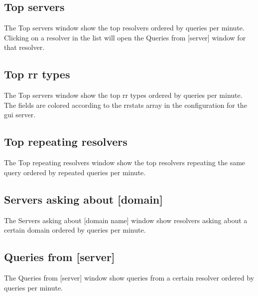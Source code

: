\documentclass[a4paper]{article}
\begin{document}
\subsection{Top servers}
The Top servers window show the top resolvers ordered by queries per minute. 
Clicking on a resolver in the list will open the Queries from [server] window 
for that resolver.
\subsection{Top rr types}
The Top servers window show the top rr types ordered by queries per minute. 
The fields are colored according to the rrstats array in the configuration 
for the gui server. 
\subsection{Top repeating resolvers}
The Top repeating resolvers window show the top resolvers repeating the same 
query ordered by repeated queries per minute. 
\subsection{Servers asking about [domain]}
The Servers asking about [domain name] window show resolvers asking about a 
certain domain ordered by queries per minute. 
\subsection{Queries from [server]}
The Queries from [server] window show queries from a certain resolver ordered 
by queries per minute. 
\end{document}
